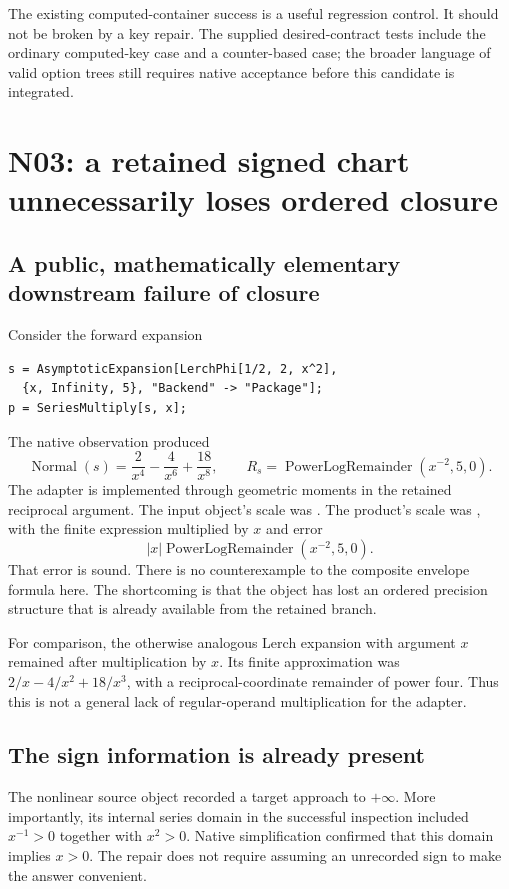 \documentclass[11pt,a4paper]{article}
\newcommand{\code}[1]{\texttt{\detokenize{#1}}}
\begin{document}
The existing computed-container success is a useful regression control. It should not be broken by a key repair. The supplied desired-contract tests include the ordinary computed-key case and a counter-based case; the broader language of valid option trees still requires native acceptance before this candidate is integrated.

\section{N03: a retained signed chart unnecessarily loses ordered closure}
\label{sec:n03}
\subsection{A public, mathematically elementary downstream failure of closure}
Consider the forward expansion
\begin{lstlisting}
s = AsymptoticExpansion[LerchPhi[1/2, 2, x^2],
  {x, Infinity, 5}, "Backend" -> "Package"];
p = SeriesMultiply[s, x];
\end{lstlisting}
The native observation produced
\begin{equation}
 \operatorname{Normal}(s)=\frac{2}{x^4}-\frac{4}{x^6}+\frac{18}{x^8},
 \qquad R_s=\operatorname{PowerLogRemainder}(x^{-2},5,0).
 \label{eq:lerch-source}
\end{equation}
The adapter is implemented through geometric moments in the retained reciprocal argument.\cite{dirichlet-source} The input object's scale was \code{PowerLog}. The product's scale was \code{Composite}, with the finite expression multiplied by $x$ and error
\begin{equation}
 |x|\operatorname{PowerLogRemainder}(x^{-2},5,0).
 \label{eq:lerch-composite}
\end{equation}
That error is sound. There is no counterexample to the composite envelope formula here. The shortcoming is that the object has lost an ordered precision structure that is already available from the retained branch.

For comparison, the otherwise analogous Lerch expansion with argument $x$ remained \code{PowerLog} after multiplication by $x$. Its finite approximation was $2/x-4/x^2+18/x^3$, with a reciprocal-coordinate remainder of power four. Thus this is not a general lack of regular-operand multiplication for the adapter.

\subsection{The sign information is already present}
The nonlinear source object recorded a target approach to $+\infty$. More importantly, its internal series domain in the successful inspection included $x^{-1}>0$ together with $x^2>0$. Native simplification confirmed that this domain implies $x>0$. The repair does not require assuming an unrecorded sign to make the answer convenient.
\end{document}
